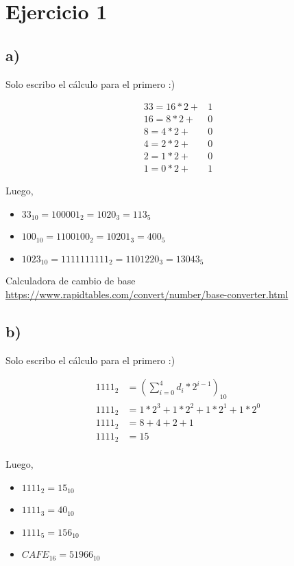 \section*{Ejercicio 1}

\subsection*{a)}

Solo escribo el cálculo para el primero :)

\begin{align*}
    33 = 16 * 2 + &1 \\
    16 = 8 * 2 + &0 \\
    8 = 4 * 2 + &0 \\
    4 = 2 * 2 + &0 \\
    2 = 1 * 2 + &0 \\
    1 = 0 * 2 + &1
\end{align*}

Luego,
\begin{itemize}
    \item $33_{10} = 100001_{2} = 1020_{3} = 113_{5}$
    \item $100_{10} = 1100100_{2} = 10201_{3} = 400_{5}$
    \item $1023_{10} = 1111111111_{2} = 1101220_{3} = 13043_{5}$
\end{itemize}

Calculadora de cambio de base \url{https://www.rapidtables.com/convert/number/base-converter.html}

\subsection*{b)}

Solo escribo el cálculo para el primero :)

\begin{align*}
    1111_2 &= \left(\sum_{i = 0}^{4}d_i * 2^{i-1}\right)_{10} \\
    1111_2 &= 1 * 2^3 + 1 * 2^2 + 1 * 2^1 + 1 * 2^0 \\
    1111_2 &= 8 + 4 + 2 + 1 \\
    1111_2 &= 15 \\
\end{align*}

Luego,
\begin{itemize}
    \item $1111_2 = 15_{10}$
    \item $1111_3 = 40_{10}$
    \item $1111_5 = 156_{10}$
    \item $CAFE_{16} = 51966_{10}$
\end{itemize}

